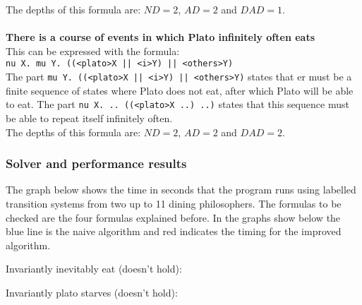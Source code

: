 \documentclass[10pt,a4paper]{article}
\begin{document}
The depths of this formula are: $ND = 2$, $AD = 2$ and $DAD = 1$.
\\\\
\textbf{There is a course of events in which Plato infinitely often eats}\\
This can be expressed with the formula:\\
{\tt nu X. mu Y. ((<plato>X || <i>Y) || <others>Y)}\\
The part {\tt mu Y. ((<plato>X || <i>Y) || <others>Y)} states that er must be a finite sequence of states where Plato does not eat, after which Plato will be able to eat. The part {\tt nu X. .. ((<plato>X ..) ..)} states that this sequence must be able to repeat itself infinitely often.\\
The depths of this formula are: $ND = 2$, $AD = 2$ and $DAD = 2$.

\subsubsection{Solver and performance results}

The graph below shows the time in seconds that the program runs using labelled transition systems from two up to 11 dining philosophers. The formulas to be checked are the four formulas explained before. In the graphs show below the blue line is the naive algorithm and red indicates the timing for the improved algorithm.

Invariantly inevitably eat (doesn't hold):


Invariantly plato starves (doesn't hold):

\end{document}
